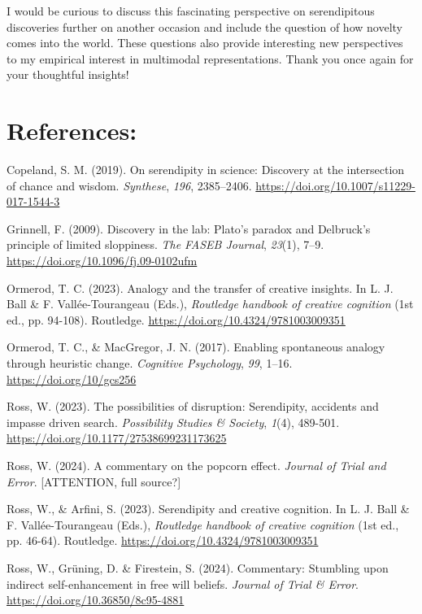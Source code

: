 \documentclass[authordate, commentary]{jote-new-article}
\begin{document}
	I would be curious to discuss this fascinating perspective on serendipitous discoveries further on another occasion and include the question of how novelty comes into the world. These questions also provide interesting new perspectives to my empirical interest in multimodal representations. Thank you once again for your thoughtful insights!



	\section{References:}



	Copeland, S. M. (2019). On serendipity in science: Discovery at the intersection of chance and wisdom. \emph{Synthese}, \emph{196}, 2385--2406. \url{https://doi.org/10.1007/s11229-017-1544-3}



	Grinnell, F. (2009). Discovery in the lab: Plato's paradox and Delbruck's principle of limited sloppiness. \emph{The FASEB Journal}, \emph{23}(1), 7--9. \url{https://doi.org/10.1096/fj.09-0102ufm}



	Ormerod, T. C. (2023). Analogy and the transfer of creative insights. In L. J. Ball \& F. Vallée-Tourangeau (Eds.), \emph{Routledge handbook of creative cognition }(1st ed., pp. 94-108). Routledge. \url{https://doi.org/10.4324/9781003009351}



	Ormerod, T. C., \& MacGregor, J. N. (2017). Enabling spontaneous analogy through heuristic change. \emph{Cognitive Psychology}, \emph{99}, 1--16. \url{https://doi.org/10/gcs256}



	Ross, W. (2023). The possibilities of disruption: Serendipity, accidents and impasse driven search. \emph{Possibility Studies \& Society}, \emph{1}(4), 489-501. \url{https://doi.org/10.1177/27538699231173625}

	Ross, W. (2024). A commentary on the popcorn effect. \emph{Journal of Trial and Error}. [ATTENTION, full source?]

	Ross, W., \& Arfini, S. (2023). Serendipity and creative cognition. In L. J. Ball \& F. Vallée-Tourangeau (Eds.), \emph{Routledge handbook of creative cognition }(1st ed., pp. 46-64). Routledge. \url{https://doi.org/10.4324/9781003009351}



	Ross, W., Grüning, D. \& Firestein, S. (2024). Commentary: Stumbling upon indirect self-enhancement in free will beliefs. \emph{Journal of Trial \& Error}. \url{https://doi.org/10.36850/8c95-4881}
\end{document}
